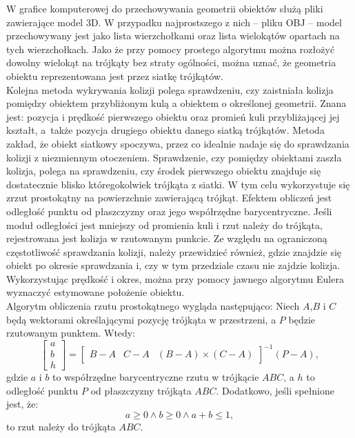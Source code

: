 W grafice komputerowej do przechowywania geometrii obiektów służą pliki zawierające model 3D. W przypadku najprostszego z nich -- pliku OBJ -- model przechowywany jest jako lista wierzchołkami oraz lista wielokątów opartach na tych wierzchołkach. Jako że przy pomocy prostego algorytmu można rozłożyć dowolny wielokąt na trójkąty bez straty ogólności, można uznać, że geometria obiektu reprezentowana jest przez siatkę trójkątów.\\

Kolejna metoda wykrywania kolizji polega sprawdzeniu, czy zaistniała kolizja pomiędzy obiektem przybliżonym kulą a obiektem o określonej geometrii. Znana jest: pozycja i prędkość pierwszego obiektu oraz promień kuli przybliżającej jej kształt, a~także pozycja drugiego obiektu danego siatką trójkątów. Metoda zakład, że obiekt siatkowy spoczywa, przez co idealnie nadaje się do sprawdzania kolizji z niezmiennym otoczeniem. Sprawdzenie, czy pomiędzy obiektami zaszła kolizja, polega na sprawdzeniu, czy środek pierwszego obiektu znajduje się dostatecznie blisko któregokolwiek trójkąta z siatki. W tym celu wykorzystuje się zrzut prostokątny na powierzchnie zawierającą trójkąt. Efektem obliczeń jest odległość punktu od płaszczyzny oraz jego współrzędne barycentryczne. Jeśli moduł odległości jest mniejszy od promienia kuli i rzut należy do trójkąta, rejestrowana jest kolizja w rzutowanym punkcie. Ze względu na ograniczoną częstotliwość sprawdzania kolizji, należy przewidzieć również, gdzie znajdzie się obiekt po okresie sprawdzania i, czy w tym przedziale czasu nie zajdzie kolizja. Wykorzystując prędkość i okres, można przy pomocy jawnego algorytmu Eulera wyznaczyć estymowane położenie obiektu.\\

Algorytm obliczenia rzutu prostokątnego wygląda następująco: Niech $A$,$B$ i $C$ będą wektorami określającymi pozycję trójkąta w przestrzeni, a $P$ będzie rzutowanym punktem. Wtedy:
\[
	\begin{bmatrix}
	a \\ b \\ h
	\end{bmatrix}
	=
	\begin{bmatrix}
	B - A & C - A & (B - A) \times (C - A)
	\end{bmatrix}^{-1} \left( P - A \right),
\]
gdzie $a$ i $b$ to współrzędne barycentryczne rzutu w trójkącie $ABC$, a $h$ to odległość punktu $P$ od płaszczyzny trójkąta $ABC$. Dodatkowo, jeśli spełnione jest, że:
\[
a \geq 0 \land b \geq 0 \land a + b \leq 1,
\]
to rzut należy do trójkąta $ABC$.\\

